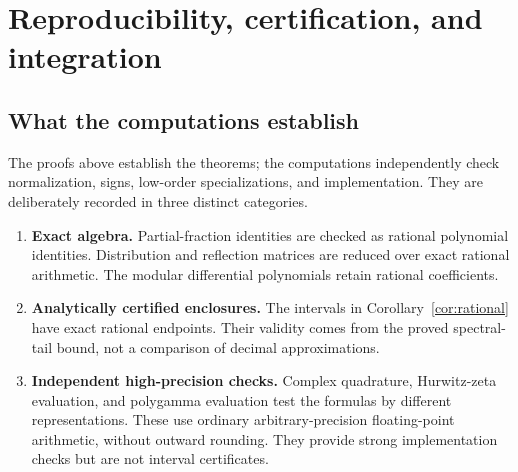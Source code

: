 \section{Reproducibility, certification, and integration}
\label{sec:reproducibility}

\subsection{What the computations establish}

The proofs above establish the theorems; the computations independently
check normalization, signs, low-order specializations, and implementation.
They are deliberately recorded in three distinct categories.
\begin{enumerate}
\item \textbf{Exact algebra.} Partial-fraction identities are checked
as rational polynomial identities. Distribution and reflection matrices
are reduced over exact rational arithmetic. The modular differential
polynomials retain rational coefficients.
\item \textbf{Analytically certified enclosures.} The intervals in
Corollary~\ref{cor:rational} have exact rational endpoints. Their validity
comes from the proved spectral-tail bound, not a comparison of decimal
approximations.
\item \textbf{Independent high-precision checks.} Complex quadrature,
Hurwitz-zeta evaluation, and polygamma evaluation test the formulas by
different representations. These use ordinary arbitrary-precision
floating-point arithmetic, without outward rounding. They provide
strong implementation checks but are not interval certificates.
\end{enumerate}

